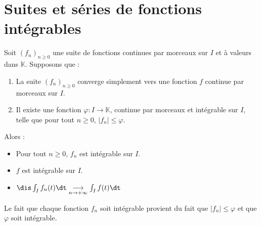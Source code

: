 \documentclass[a4paper,10pt]{report}
\begin{document}
\section{Suites et séries de fonctions intégrables}

\newpage

\begin{thm}
Soit $(f_n)_{n \geq 0}$ une suite de fonctions continues par morceaux sur $I$ et à valeurs dans $\mathbb{K}$. Supposons que :
\begin{enumerate}
\item La suite $(f_n)_{n \geq 0}$ converge simplement vers une fonction $f$ continue par morceaux sur $I$.
\item Il existe une fonction $\varphi : I \rightarrow \mathbb{K}$, continue par morceaux et intégrable sur $I$, telle que pour tout $n \geq 0$, $\vert f_n \vert \leq \varphi$.
\end{enumerate}
Alors :
\begin{itemize}
\item Pour tout $n \geq 0$, $f_n$ est intégrable sur $I$.
\item $f$ est intégrable sur $I$.
\item $\dis \int_{I} f_n(t) \dt \underset{n \rightarrow + \infty}{ \longrightarrow} \int_{I} f(t) \dt$
\end{itemize}
\end{thm}

\begin{rem} Le fait que chaque fonction $f_n$ soit intégrable provient du fait que $\vert f_n \vert \leq \varphi$ et que $\varphi$ soit intégrable.
\end{rem}
\end{document}
